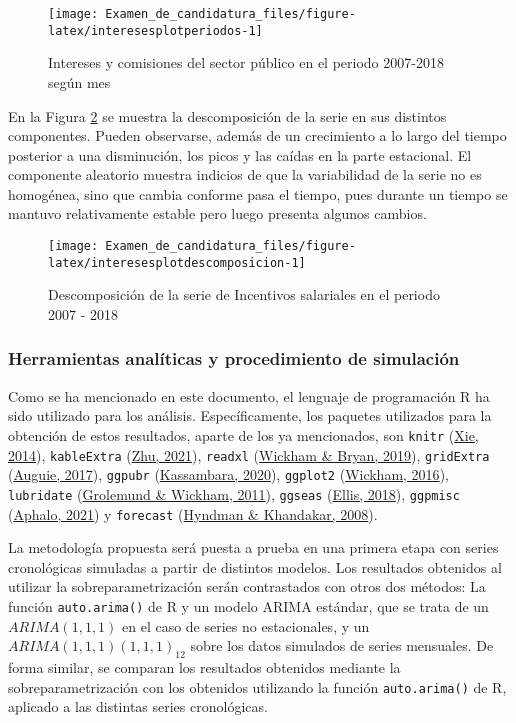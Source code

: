 \documentclass[
]{article}
\begin{document}
\begin{figure}[H]
\texttt{[image: Examen\_de\_candidatura\_files/figure-latex/interesesplotperiodos-1]} \caption{Intereses y comisiones del sector público en el periodo 2007-2018 según mes}\label{fig:interesesplotperiodos}
\end{figure}

En la Figura \ref{fig:interesesplotdescomposicion} se muestra la
descomposición de la serie en sus distintos componentes. Pueden
observarse, además de un crecimiento a lo largo del tiempo posterior a
una disminución, los picos y las caídas en la parte estacional. El
componente aleatorio muestra indicios de que la variabilidad de la serie
no es homogénea, sino que cambia conforme pasa el tiempo, pues durante
un tiempo se mantuvo relativamente estable pero luego presenta algunos
cambios.

\begin{figure}[H]
\texttt{[image: Examen\_de\_candidatura\_files/figure-latex/interesesplotdescomposicion-1]} \caption{Descomposición de la serie de Incentivos salariales en el periodo 2007 - 2018}\label{fig:interesesplotdescomposicion}
\end{figure}

\subsubsection{Herramientas analíticas y procedimiento de simulación}

Como se ha mencionado en este documento, el lenguaje de programación R
ha sido utilizado para los análisis. Específicamente, los paquetes
utilizados para la obtención de estos resultados, aparte de los ya
mencionados, son \texttt{knitr} (\protect\hyperlink{ref-knitr}{Xie,
2014}), \texttt{kableExtra} (\protect\hyperlink{ref-kableExtra}{Zhu,
2021}), \texttt{readxl} (\protect\hyperlink{ref-readxl}{Wickham \&
Bryan, 2019}), \texttt{gridExtra}
(\protect\hyperlink{ref-gridExtra}{Auguie, 2017}), \texttt{ggpubr}
(\protect\hyperlink{ref-ggpubr}{Kassambara, 2020}), \texttt{ggplot2}
(\protect\hyperlink{ref-ggplot2}{Wickham, 2016}), \texttt{lubridate}
(\protect\hyperlink{ref-lubridate}{Grolemund \& Wickham, 2011}),
\texttt{ggseas} (\protect\hyperlink{ref-ggseas}{Ellis, 2018}),
\texttt{ggpmisc} (\protect\hyperlink{ref-ggpmisc}{Aphalo, 2021}) y
\texttt{forecast} (\protect\hyperlink{ref-forecast}{Hyndman \&
Khandakar, 2008}).

La metodología propuesta será puesta a prueba en una primera etapa con
series cronológicas simuladas a partir de distintos modelos. Los
resultados obtenidos al utilizar la sobreparametrización serán
contrastados con otros dos métodos: La función \texttt{auto.arima()} de
R y un modelo ARIMA estándar, que se trata de un \(ARIMA(1,1,1)\) en el
caso de series no estacionales, y un \(ARIMA(1,1,1)(1,1,1)_{12}\) sobre
los datos simulados de series mensuales. De forma similar, se comparan
los resultados obtenidos mediante la sobreparametrización con los
obtenidos utilizando la función \texttt{auto.arima()} de R, aplicado a
las distintas series cronológicas.
\end{document}
